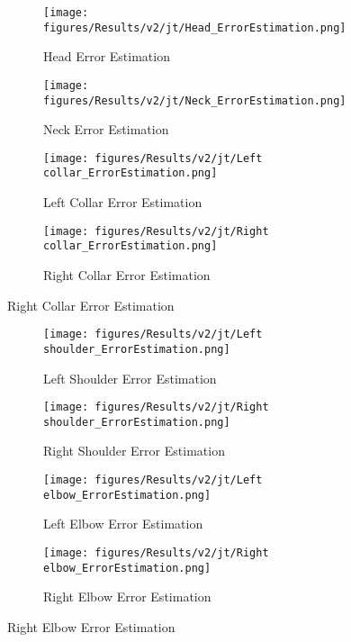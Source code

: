 \begin{figure}[!ht]
    \centering
    \begin{subfigure}[b]{0.47\linewidth}
        \centering
        \texttt{[image: figures/Results/v2/jt/Head\_ErrorEstimation.png]}
        \caption{Head Error Estimation}
        \label{fig:v2_head_jt_ee}
    \end{subfigure}
    \hfill
    \begin{subfigure}[b]{0.47\linewidth}
        \centering
        \texttt{[image: figures/Results/v2/jt/Neck\_ErrorEstimation.png]}
        \caption{Neck Error Estimation}
        \label{fig:v2_neck_jt_ee}
    \end{subfigure}
    \hfill
    \begin{subfigure}[b]{0.47\linewidth}
        \centering
        \texttt{[image: figures/Results/v2/jt/Left collar\_ErrorEstimation.png]}
        \caption{Left Collar Error Estimation}
        \label{fig:v2_leco_jt_ee}
    \end{subfigure}
    \hfill
    \begin{subfigure}[b]{0.47\linewidth}
        \centering
        \texttt{[image: figures/Results/v2/jt/Right collar\_ErrorEstimation.png]}
        \caption{Right Collar Error Estimation}
        \label{fig:v2_rico_jt_ee}
    \end{subfigure}
  \end{figure}
  
  
  \begin{figure}[!ht]
    \centering
    \begin{subfigure}[b]{0.47\linewidth}
        \centering
        \texttt{[image: figures/Results/v2/jt/Left shoulder\_ErrorEstimation.png]}
        \caption{Left Shoulder Error Estimation}
        \label{fig:v2_lesh_jt_ee}
    \end{subfigure}
    \hfill
    \begin{subfigure}[b]{0.47\linewidth}
        \centering
        \texttt{[image: figures/Results/v2/jt/Right shoulder\_ErrorEstimation.png]}
        \caption{Right Shoulder Error Estimation}
        \label{fig:v2_rish_jt_ee}
    \end{subfigure}
    \hfill
    \begin{subfigure}[b]{0.47\linewidth}
        \centering
        \texttt{[image: figures/Results/v2/jt/Left elbow\_ErrorEstimation.png]}
        \caption{Left Elbow Error Estimation}
        \label{fig:v2_leel_jt_ee}
    \end{subfigure}
    \hfill
    \begin{subfigure}[b]{0.47\linewidth}
        \centering
        \texttt{[image: figures/Results/v2/jt/Right elbow\_ErrorEstimation.png]}
        \caption{Right Elbow Error Estimation}
        \label{fig:v2_reel_jt_ee}
    \end{subfigure}
  \end{figure}
  
